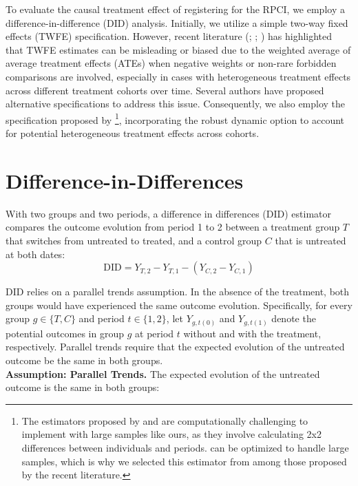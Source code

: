 \documentclass[10pt, oneside]{book}
\begin{document}
To evaluate the causal treatment effect of registering for the RPCI, we employ a difference-in-difference (DID) analysis. Initially, we utilize a simple two-way fixed effects (TWFE) specification. However, recent literature (\citealt{de2020two}; \citealt{callaway2021difference}; \citealt{sun2021estimating}) has highlighted that TWFE estimates can be misleading or biased due to the weighted average of average treatment effects (ATEs) when negative weights or non-rare forbidden comparisons are involved, especially in cases with heterogeneous treatment effects across different treatment cohorts over time. Several authors have proposed alternative specifications to address this issue. Consequently, we also employ the specification proposed by \cite{de2020two}\footnote{The estimators proposed by \cite{callaway2021difference} and \cite{sun2021estimating} are computationally challenging to implement with large samples like ours, as they involve calculating 2x2 differences between individuals and periods. \cite{de2020two} can be optimized to handle large samples, which is why we selected this estimator from among those proposed by the recent literature.}, incorporating the robust dynamic option to account for potential heterogeneous treatment effects across cohorts. \\

\section{Difference-in-Differences}

With two groups and two periods, a difference in differences (DID) estimator compares the outcome evolution from period 1 to 2 between a treatment group $T$ that switches from untreated to treated, and a control group $C$ that is untreated at both dates: \\

$$\text{DID} = Y_{T,2} - Y_{T,1} - (Y_{C,2} - Y_{C,1})$$

DID relies on a parallel trends assumption. In the absence of the treatment, both groups would have experienced the same outcome evolution. Specifically, for every group $g \in \{T, C\}$ and period $t \in \{1, 2\}$, let $Y_{g,t(0)}$ and $Y_{g,t(1)}$ denote the potential outcomes in group $g$ at period $t$ without and with the treatment, respectively. Parallel trends require that the expected evolution of the untreated outcome be the same in both groups. \\

\textbf{Assumption: Parallel Trends.} The expected evolution of the untreated outcome is the same in both groups: 
\end{document}
